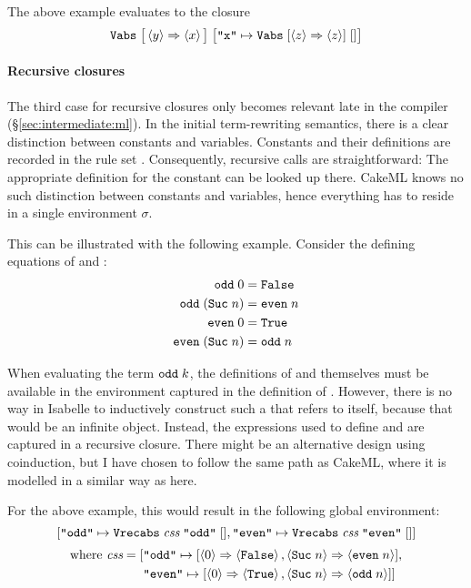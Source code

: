 \noindent
The above example evaluates to the closure
%
\[ \texttt{\textup{Vabs}}\;\big[\left\langle y\right\rangle \Rightarrow \left\langle x\right\rangle\big]\;\big[\texttt{"x"} \mapsto \texttt{\textup{Vabs}}\;[\left\langle z\right\rangle \Rightarrow \left\langle z\right\rangle]\;[]\big] \]
%

\paragraph{Recursive closures}
The third case for recursive closures only becomes relevant late in the compiler (§\ref{sec:intermediate:ml}).
In the initial term-rewriting semantics, there is a clear distinction between constants and variables.
Constants and their definitions are recorded in the rule set \rs.
Consequently, recursive calls are straightforward:
The appropriate definition for the constant can be looked up there.
CakeML knows no such distinction between constants and variables, hence everything has to reside in a single environment $\sigma$.

This can be illustrated with the following example.
Consider the defining equations of  and :
\begin{align*}
  \texttt{\textup{odd}}\;0 &= \texttt{\textup{False}} \\
  \texttt{\textup{odd}}\;(\texttt{\textup{Suc}}\;n) &= \texttt{\textup{even}}\;n \\
  \texttt{\textup{even}}\;0 &= \texttt{\textup{True}} \\
  \texttt{\textup{even}}\;(\texttt{\textup{Suc}}\;n) &= \texttt{\textup{odd}}\;n
\end{align*}

\noindent
When evaluating the term $\texttt{\textup{odd}}\;k$, the definitions of  and  themselves must be available in the environment captured in the definition of .
However, there is no way in Isabelle to inductively construct such a  that refers to itself, because that would be an infinite object.
Instead, the expressions used to define  and  are captured in a recursive closure.
There might be an alternative design using coinduction, but I have chosen to follow the same path as CakeML, where it is modelled in a similar way as here.

For the above example, this would result in the following global environment:
%
\[
  [\texttt{"odd"} \mapsto \texttt{\textup{Vrecabs}}\;\textit{css}\;\texttt{"odd"}\;[], \texttt{"even"} \mapsto \texttt{\textup{Vrecabs}}\;\textit{css}\;\texttt{"even"}\;[]]
\]
\[
  \begin{aligned}
    \text{where } \textit{css} = [&\texttt{"odd"} \mapsto [ \left\langle0\right\rangle \Rightarrow \left\langle\texttt{\textup{False}}\right\rangle, \left\langle\texttt{\textup{Suc}}\;n\right\rangle \Rightarrow \left\langle\texttt{\textup{even}}\;n\right\rangle], \\
                          &\texttt{"even"} \mapsto [ \left\langle0\right\rangle \Rightarrow \left\langle\texttt{\textup{True}}\right\rangle, \left\langle\texttt{\textup{Suc}}\;n\right\rangle \Rightarrow \left\langle\texttt{\textup{odd}}\;n\right\rangle]]
  \end{aligned}
\]

